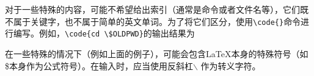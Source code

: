 对于一些特殊的内容，可能不希望给出索引（通常是命令或者文件名等），它们既不属于关键字，也不属于简单的英文单词。为了将它们区分，使用\verb|\code{}|命令进行编写。例如，\verb|\code{cd \$OLDPWD}|的输出结果为

\begin{attention}
    在一些特殊的情况下（例如上面的例子），可能会包含\LaTeX 本身的特殊符号（如\$本身作为公式符号）。在输入时，应当使用反斜杠$\backslash$ 作为转义字符。
\end{attention}
